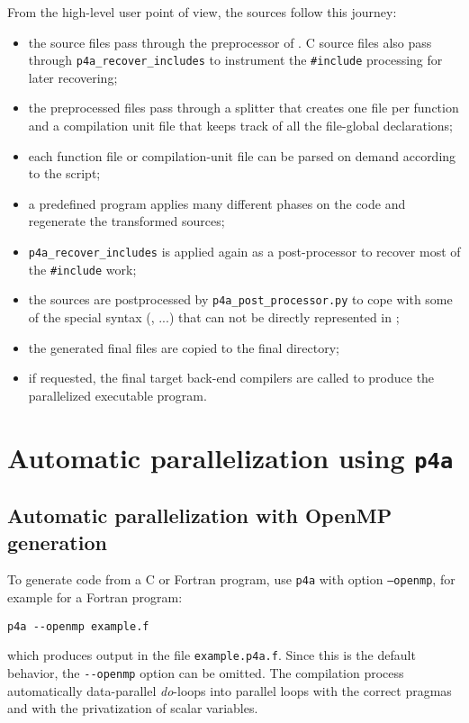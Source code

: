 \documentclass[a4paper]{article}
\begin{document}
From the high-level user point of view, the sources follow this journey:
\begin{itemize}
\item the source files pass through the preprocessor of
  \Apips. C source files also pass through
  \verb|p4a_recover_includes| to instrument the
  \verb|#include| processing for later recovering;
\item the preprocessed files pass through a splitter that creates
  one file per function and a compilation unit file that keeps track
  of all the file-global declarations;
\item each function file or compilation-unit file can be parsed on
  demand according to the \Apyps script;
\item a predefined \Apyps program applies many different \Apips phases on
  the code and regenerate the transformed sources;
\item \verb|p4a_recover_includes| is applied again as a post-processor
  to recover most of the \verb|#include| work;
\item the sources are postprocessed by
  \verb|p4a_post_processor.py| to cope with some of the special syntax
  (\Acuda, \Aopencl...) that can not be directly represented in \Apips;
\item the generated final files are copied to the final directory;
\item if requested, the final target back-end compilers are called to
  produce the parallelized executable program.
\end{itemize}


\section{Automatic parallelization using \protect\texttt{p4a}}
\label{sec:examples}

\subsection{Automatic parallelization with OpenMP generation}
\label{sec:autom-parall-with}

To generate \Aopenmp code from a C or Fortran program, use \texttt{p4a}
with option \texttt{--openmp}, for example for a Fortran program:
\begin{verbatim}
p4a --openmp example.f
\end{verbatim}
which produces output in the file \texttt{example.p4a.f}. Since this is
the default
behavior, the \verb/--openmp/ option can be omitted. The compilation
process automatically data-parallel \emph{do}-loops into
\Aopenmp parallel loops with the correct pragmas and with the privatization of
scalar variables.
\end{document}
